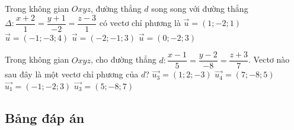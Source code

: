 \begin{ex}%
	Trong không gian $Oxyz$, đường thẳng $d$ song song với đường thẳng $\Delta \colon \dfrac{x+2}{1}=\dfrac{y+1}{-2}=\dfrac{z-3}{1}$ có vectơ chỉ phương là
	\choice
	{\True $\overrightarrow{u}=(1;-2;1)$}
	{$\overrightarrow{u}=(-1;-3;4)$}
	{$\overrightarrow{u}=(-2;-1;3)$}
	{$\overrightarrow{u}=(0;-2;3)$}
\end{ex}

\begin{ex}%
	Trong không gian $Oxyz$, cho đường thẳng $d \colon \dfrac{x-1}{5}=\dfrac{y-2}{-8}=\dfrac{z+3}{7}$. Vectơ nào sau đây là một vectơ chỉ phương của $d$?
	\choice
	{$\overrightarrow{u_3}=(1;2;-3)$}
	{$\overrightarrow{u_4}=(7;-8;5)$}
	{$\overrightarrow{u_1}=(-1;-2;3)$}
	{\True $\overrightarrow{u_3}=(5;-8;7)$}
\end{ex}

\subsection{Bảng đáp án}
